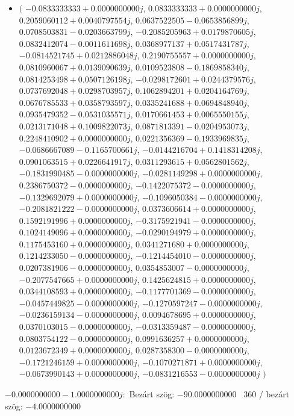 \documentclass[14pt,a4paper]{article}
\begin{document}
\begin{itemize}
\item
$\big($
$-0.0833333333+0.0000000000j$, $0.0833333333+0.0000000000j$, $0.2059060112+0.0040797554j$, $0.0637522505-0.0653856899j$, $0.0708503831-0.0203663799j$, $-0.2085205963+0.0179870605j$, $0.0832412074-0.0011611698j$, $0.0368977137+0.0517431787j$, $-0.0814521745+0.0212886048j$, $0.2190755557+0.0000000000j$, $0.0810960067+0.0139090639j$, $0.0109523808-0.1869858340j$, $0.0814253498+0.0507126198j$, $-0.0298172601+0.0244379576j$, $0.0737692048+0.0298703957j$, $0.1062894201+0.0204164769j$, $0.0676785533+0.0358793597j$, $0.0335241688+0.0694848940j$, $0.0935479352-0.0531035571j$, $0.0170661453+0.0065550155j$, $0.0213171048+0.1009822073j$, $0.0871813391-0.0204953073j$, $0.2248410902+0.0000000000j$, $0.0221356369-0.1933969835j$, $-0.0686667089-0.1165700661j$, $-0.0144216704+0.1418314208j$, $0.0901063515+0.0226641917j$, $0.0311293615+0.0562801562j$, $-0.1831990485-0.0000000000j$, $-0.0281149298+0.0000000000j$, $0.2386750372-0.0000000000j$, $-0.1422075372-0.0000000000j$, $-0.1329692079+0.0000000000j$, $-0.1096050384-0.0000000000j$, $-0.2081821222-0.0000000000j$, $0.0373606614+0.0000000000j$, $0.1592191996+0.0000000000j$, $-0.3175921941-0.0000000000j$, $0.1024149096+0.0000000000j$, $-0.0290194979+0.0000000000j$, $0.1175453160+0.0000000000j$, $0.0341271680+0.0000000000j$, $0.1214233050-0.0000000000j$, $-0.1214454010-0.0000000000j$, $0.0207381906-0.0000000000j$, $0.0354853007-0.0000000000j$, $-0.2077547665+0.0000000000j$, $0.1425624815+0.0000000000j$, $0.0344108593+0.0000000000j$, $-0.1177701369-0.0000000000j$, $-0.0457449825-0.0000000000j$, $-0.1270597247-0.0000000000j$, $-0.0236159134-0.0000000000j$, $0.0094678695+0.0000000000j$, $0.0370103015-0.0000000000j$, $-0.0313359487-0.0000000000j$, $0.0803754122-0.0000000000j$, $0.0991636257+0.0000000000j$, $0.0123672349+0.0000000000j$, $0.0287358300-0.0000000000j$, $-0.1721246159+0.0000000000j$, $-0.1070271871+0.0000000000j$, $-0.0673990143+0.0000000000j$, $-0.0831216553-0.0000000000j$
$\big)$
\end{itemize}
$-0.0000000000-1.0000000000j$:\
Bezárt szög: $-90.0000000000$ \
360 / bezárt szög: $-4.0000000000$\
\end{document}

